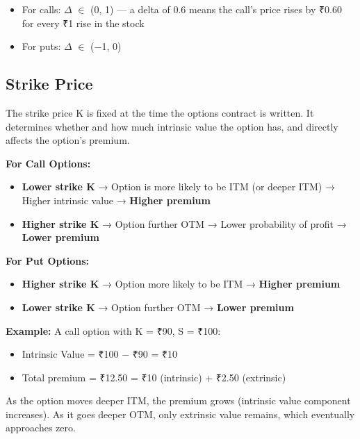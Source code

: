 \documentclass[12pt,openany]{book}
\theoremstyle{definition}
\theoremstyle{remark}
\begin{document}
\begin{itemize}
\item For calls: \(\Delta\) \(\in\) (0, 1) --- a delta of 0.6 means the call's price rises by ₹0.60 for every ₹1 rise in the stock


\item For puts: \(\Delta\) \(\in\) (\(-\)1, 0)


\end{itemize}
\medskip
\subsection{Strike Price}
The strike price K is fixed at the time the options contract is written. It determines whether and how much intrinsic value the option has, and directly affects the option's premium.

\textbf{For Call Options:}

\begin{itemize}
\item \textbf{Lower strike K} → Option is more likely to be ITM (or deeper ITM) → Higher intrinsic value → \textbf{Higher premium}


\item \textbf{Higher strike K} → Option further OTM → Lower probability of profit → \textbf{Lower premium}


\end{itemize}
\textbf{For Put Options:}

\begin{itemize}
\item \textbf{Higher strike K} → Option more likely to be ITM → \textbf{Higher premium}


\item \textbf{Lower strike K} → Option further OTM → \textbf{Lower premium}


\end{itemize}
\textbf{Example:} A call option with K = ₹90, S = ₹100:

\begin{itemize}
\item Intrinsic Value = ₹100 \(-\) ₹90 = ₹10


\item Total premium = ₹12.50 = ₹10 (intrinsic) + ₹2.50 (extrinsic)


\end{itemize}
As the option moves deeper ITM, the premium grows (intrinsic value component increases). As it goes deeper OTM, only extrinsic value remains, which eventually approaches zero.
\end{document}
